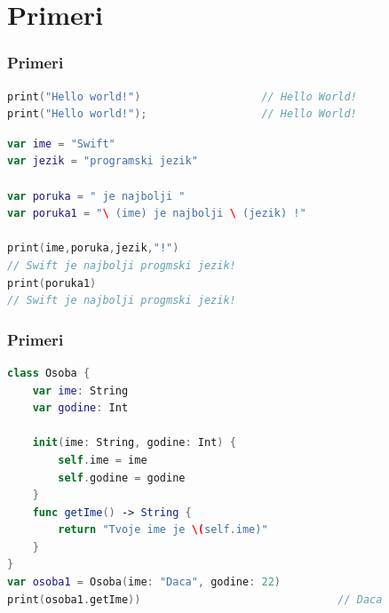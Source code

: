 \documentclass{beamer}
\begin{document}
\section{Primeri}
\begin{frame}[fragile]
\frametitle{Primeri}
\begin{lstlisting}[language=Swift, caption={Ispis teksta},frame=single, label=simple]
print("Hello world!")				    // Hello World!
print("Hello world!");					// Hello World!
\end{lstlisting}

\begin{lstlisting}[language=Swift, caption={Stringovi i konkatenacija stringova},frame=single, label=simple]
var ime = "Swift"
var jezik = "programski jezik"

var poruka = " je najbolji "
var poruka1 = "\ (ime) je najbolji \ (jezik) !" 

print(ime,poruka,jezik,"!")
// Swift je najbolji progmski jezik!
print(poruka1) 
// Swift je najbolji progmski jezik!
\end{lstlisting}

\end{frame}


\begin{frame}[fragile]
\frametitle{Primeri}
\begin{lstlisting}[language=Swift, caption={Klasa},frame=single, label=simple]
class Osoba {
    var ime: String
    var godine: Int
    
    init(ime: String, godine: Int) {
        self.ime = ime
        self.godine = godine
    }
    func getIme() -> String {
        return "Tvoje ime je \(self.ime)"
	}
}
var osoba1 = Osoba(ime: "Daca", godine: 22)
print(osoba1.getIme))								// Daca
\end{lstlisting}


\end{frame}
\end{document}

